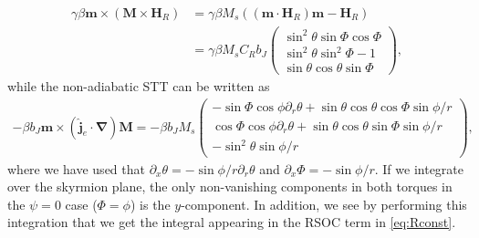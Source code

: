\begin{align}
    \nonumber \gamma\beta\mathbold{m}\times\left(\mathbold{M}\times\mathbold{H}_R\right) &= \gamma\beta M_s\left(\left(\mathbold{m}\cdot\mathbold{H}_R\right)\mathbold{m}-\mathbold{H}_R\right) \\
    &=     
    \gamma\beta M_s C_R b_J
    \begin{pmatrix}
     \sin^2\theta\sin\Phi\cos\Phi \\
     \sin^2\theta\sin^2\Phi-1 \\
     \sin\theta\cos\theta\sin\Phi
    \end{pmatrix},
\end{align}
while the non-adiabatic STT can be written as 
\begin{align}
    -\beta b_J\mathbold{m}\times\left(\mathbold{\hat{j}}_e\cdot\mathbold{\nabla}\right)\mathbold{M} =     
    -\beta b_J M_s
    \begin{pmatrix}
     -\sin\Phi\cos\phi\partial_r\theta + \sin\theta\cos\theta\cos\Phi\sin\phi/r \\
     \cos\Phi\cos\phi\partial_r\theta + \sin\theta\cos\theta\sin\Phi\sin\phi/r \\
     -\sin^2\theta\sin\phi/r
    \end{pmatrix},
\end{align}
where we have used that $\partial_x\theta = -\sin\phi/r\partial_r\theta$ and $\partial_x\Phi = -\sin\phi/r$. If we integrate over the skyrmion plane, the only non-vanishing components in both torques in the $\psi=0$ case ($\Phi=\phi$) is the $y$-component. In addition, we see by performing this integration that we get the integral appearing in the RSOC term in \eqref{eq:Rconst}.

